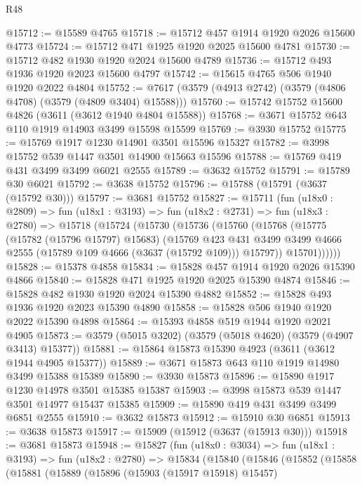 \begin{lexlean}{R48}
\begin{coremodule}
@15712 := @15589 @4765
@15718 := @15712 @457 @1914 @1920 @2026 @15600 @4773
@15724 := @15712 @471 @1925 @1920 @2025 @15600 @4781
@15730 := @15712 @482 @1930 @1920 @2024 @15600 @4789
@15736 := @15712 @493 @1936 @1920 @2023 @15600 @4797
@15742 := @15615 @4765 @506 @1940 @1920 @2022 @4804
@15752 := @7617 (@3579 (@4913 @2742) (@3579 (@4806 @4708) (@3579 (@4809 @3404) @15588)))
@15760 := @15742 @15752 @15600 @4826 (@3611 (@3612 @1940 @4804 @15588))
@15768 := @3671 @15752 @643 @110 @1919 @14903 @3499 @15598 @15599
@15769 := @3930 @15752
@15775 := @15769 @1917 @1230 @14901 @3501 @15596 @15327
@15782 := @3998 @15752 @539 @1447 @3501 @14900 @15663 @15596
@15788 := @15769 @419 @431 @3499 @3499 @6021 @2555
@15789 := @3632 @15752
@15791 := @15789 @30 @6021
@15792 := @3638 @15752
@15796 := @15788 (@15791 (@3637 (@15792 @30)))
@15797 := @3681 @15752
@15827 := @15711
    (fun (u18x0 : @2809) =>
    fun (u18x1 : @3193) =>
    fun (u18x2 : @2731) =>
    fun (u18x3 : @2780) =>
    @15718
      (@15724
        (@15730
          (@15736
            (@15760
              (@15768
                (@15775
                  (@15782 (@15796 @15797) @15683)
                  (@15769
                    @423
                    @431
                    @3499
                    @3499
                    @4666
                    @2555
                    (@15789 @109 @4666 (@3637 (@15792 @109)))
                    @15797))
                @15701))))))
@15828 := @15378 @4858
@15834 := @15828 @457 @1914 @1920 @2026 @15390 @4866
@15840 := @15828 @471 @1925 @1920 @2025 @15390 @4874
@15846 := @15828 @482 @1930 @1920 @2024 @15390 @4882
@15852 := @15828 @493 @1936 @1920 @2023 @15390 @4890
@15858 := @15828 @506 @1940 @1920 @2022 @15390 @4898
@15864 := @15393 @4858 @519 @1944 @1920 @2021 @4905
@15873 := @3579 (@5015 @3202) (@3579 (@5018 @4620) (@3579 (@4907 @3413) @15377))
@15881 := @15864 @15873 @15390 @4923 (@3611 (@3612 @1944 @4905 @15377))
@15889 := @3671 @15873 @643 @110 @1919 @14980 @3499 @15388 @15389
@15890 := @3930 @15873
@15896 := @15890 @1917 @1230 @14978 @3501 @15385 @15387
@15903 := @3998 @15873 @539 @1447 @3501 @14977 @15437 @15385
@15909 := @15890 @419 @431 @3499 @3499 @6851 @2555
@15910 := @3632 @15873
@15912 := @15910 @30 @6851
@15913 := @3638 @15873
@15917 := @15909 (@15912 (@3637 (@15913 @30)))
@15918 := @3681 @15873
@15948 := @15827
    (fun (u18x0 : @3034) =>
    fun (u18x1 : @3193) =>
    fun (u18x2 : @2780) =>
    @15834
      (@15840
        (@15846
          (@15852
            (@15858
              (@15881
                (@15889
                  (@15896
                    (@15903 (@15917 @15918) @15457)

\end{coremodule}
\end{lexlean}
